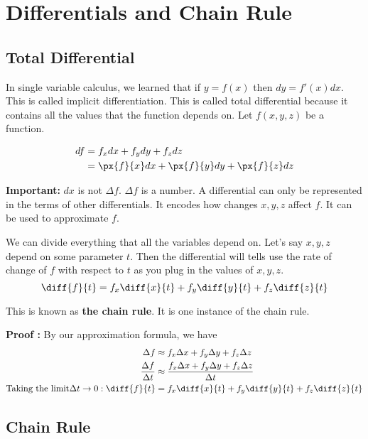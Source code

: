 

\chapter{Differentials and Chain Rule}

\bigbreak
\section{Total Differential}

In single variable calculus, we learned that if $y = f(x)$ then $dy = f'(x)dx$. This is called implicit differentiation.
This is called total differential because it contains all the values that the function depends on.
Let $f(x, y, z)$ be a function.

\begin{align*}
    df  & = f_x dx + f_y dy + f_z dz \\
        & = \px{f}{x} dx + \px{f}{y} dy + \px{f}{z} dz
\end{align*}

{\bf Important:} $dx$ is not $\Delta f$. $\Delta f$ is a number.
A differential can only be represented in the terms of other differentials.
It encodes how changes $x, y, z$ affect $f$. It can be used to approximate $f$.

We can divide everything that all the variables depend on. 
Let's say $x, y, z$ depend on some parameter $t$. 
Then the differential will tells use the rate of change of $f$ with respect to $t$ as you plug in the values of $x, y, z$.
$$
\diff{f}{t} = f_x \diff{x}{t} + f_y \diff{y}{t} + f_z \diff{z}{t}
$$

This is known as {\bf the chain rule}. It is one instance of the chain rule.

{\bf Proof : } By our approximation formula, we have
\begin{align*}
\Delta f & \approx f_x \Delta x + f_y \Delta y + f_z \Delta z \\
\frac{\Delta f}{\Delta t} & \approx  \frac{ f_x \Delta x + f_y \Delta y + f_z \Delta z }{ \Delta t } \\
\text{Taking the limit} \Delta t \to 0 : \diff{f}{t} & = f_x \diff{x}{t} + f_y \diff{y}{t} + f_z \diff{z}{t}
\end{align*}


\section{Chain Rule}

